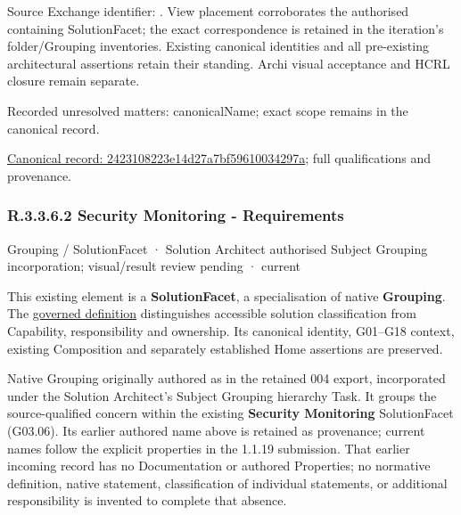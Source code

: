 Source Exchange identifier: \texttt{}. View placement corroborates
the authorised containing SolutionFacet; the exact correspondence is retained in the
iteration's folder/Grouping inventories. Existing canonical identities and all
pre-existing architectural assertions retain their standing. Archi visual
acceptance and HCRL closure remain separate.


{\small Recorded unresolved matters: canonicalName; exact scope remains in the canonical record.}\par
{\footnotesize \href{../../../../../../../continuum/grouping/2423108223e14d27a7bf59610034297a.md}{Canonical record: 2423108223e14d27a7bf59610034297a}; full qualifications and provenance.}\par
\subsubsection*{R.3.3.6.2 Security Monitoring - Requirements}
\label{navigation:R.3.3.6.2}

\label{element:60fcf91dfa7445999dfa8e039d993415}
{\small Grouping / SolutionFacet · Solution Architect authorised Subject Grouping incorporation; visual/result review pending · current}\par

This existing element is a \textbf{SolutionFacet}, a specialisation of native
\textbf{Grouping}. The \href{\detokenize{../../../../../../../governance/continuum-representation.md#solutionfacet-classification--1119-candidate}}{governed definition}
distinguishes accessible solution classification from Capability, responsibility
and ownership. Its canonical identity, G01–G18 context, existing Composition
and separately established Home assertions are preserved.



Native Grouping originally authored as \texttt{} in the retained 004 export,
incorporated under the Solution Architect's Subject Grouping hierarchy Task.
It groups the source-qualified \texttt{} concern within
the existing \textbf{Security Monitoring} SolutionFacet (G03.06). Its earlier authored name above is retained as provenance; current names
follow the explicit properties in the 1.1.19 submission.
That earlier incoming record has no Documentation or authored Properties; no normative
definition, native statement, classification of individual statements, or
additional responsibility is invented to complete that absence.



